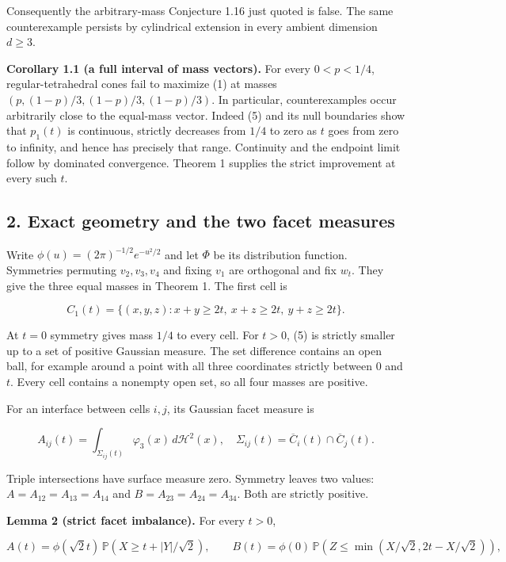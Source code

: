 \documentclass[
  11pt,
]{article}
\begin{document}
Consequently the arbitrary-mass Conjecture 1.16 just quoted is false.
The same counterexample persists by cylindrical extension in every
ambient dimension \(d\ge3\).

\textbf{Corollary 1.1 (a full interval of mass vectors).} For every
\(0<p<1/4\), regular-tetrahedral cones fail to maximize (1) at masses
\((p,(1-p)/3,(1-p)/3,(1-p)/3)\). In particular, counterexamples occur
arbitrarily close to the equal-mass vector. Indeed (5) and its null
boundaries show that \(p_1(t)\) is continuous, strictly decreases from
\(1/4\) to zero as \(t\) goes from zero to infinity, and hence has
precisely that range. Continuity and the endpoint limit follow by
dominated convergence. Theorem 1 supplies the strict improvement at
every such \(t\).

\subsection{2. Exact geometry and the two facet
measures}\label{exact-geometry-and-the-two-facet-measures}

Write \(\phi(u)=(2\pi)^{-1/2}e^{-u^2/2}\) and let \(\Phi\) be its
distribution function. Symmetries permuting \(v_2,v_3,v_4\) and fixing
\(v_1\) are orthogonal and fix \(w_t\). They give the three equal masses
in Theorem 1. The first cell is

\[
 C_1(t)=\{(x,y,z):x+y\ge2t,\ x+z\ge2t,\ y+z\ge2t\}.      \tag{5}
\]

At \(t=0\) symmetry gives mass \(1/4\) to every cell. For \(t>0\), (5)
is strictly smaller up to a set of positive Gaussian measure. The set
difference contains an open ball, for example around a point with all
three coordinates strictly between \(0\) and \(t\). Every cell contains
a nonempty open set, so all four masses are positive.

For an interface between cells \(i,j\), its Gaussian facet measure is

\[
 A_{ij}(t)=\int_{\Sigma_{ij}(t)}\varphi_3(x)\,d\mathcal H^2(x),
 \quad \Sigma_{ij}(t)=\overline C_i(t)\cap\overline C_j(t). \tag{6}
\]

Triple intersections have surface measure zero. Symmetry leaves two
values: \(A=A_{12}=A_{13}=A_{14}\) and \(B=A_{23}=A_{24}=A_{34}\). Both
are strictly positive.

\textbf{Lemma 2 (strict facet imbalance).} For every \(t>0\),

\[
 A(t)=\phi(\sqrt2t)\,\mathbb P(X\ge t+|Y|/\sqrt2),\qquad
 B(t)=\phi(0)\,\mathbb P(Z\le\min(X/\sqrt2,2t-X/\sqrt2)),\tag{7}
\]
\end{document}
